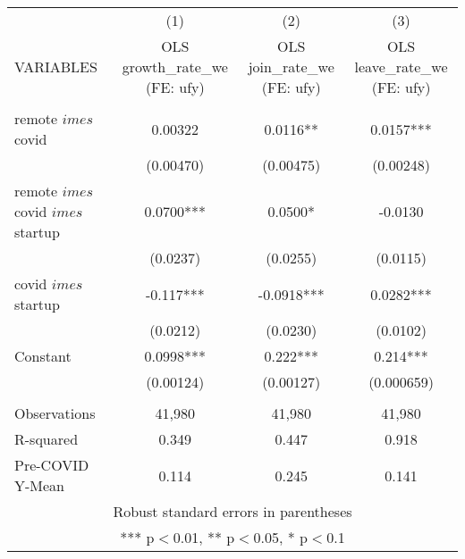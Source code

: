 \documentclass[]{article}
\begin{document}
\begin{tabular}{lccc} \hline
 & (1) & (2) & (3) \\
VARIABLES & OLS growth\_rate\_we (FE: ufy) & OLS join\_rate\_we (FE: ufy) & OLS leave\_rate\_we (FE: ufy) \\ \hline
 &  &  &  \\
remote $	imes$ covid & 0.00322 & 0.0116** & 0.0157*** \\
 & (0.00470) & (0.00475) & (0.00248) \\
remote $	imes$ covid $	imes$ startup & 0.0700*** & 0.0500* & -0.0130 \\
 & (0.0237) & (0.0255) & (0.0115) \\
covid $	imes$ startup & -0.117*** & -0.0918*** & 0.0282*** \\
 & (0.0212) & (0.0230) & (0.0102) \\
Constant & 0.0998*** & 0.222*** & 0.214*** \\
 & (0.00124) & (0.00127) & (0.000659) \\
 &  &  &  \\
Observations & 41,980 & 41,980 & 41,980 \\
R-squared & 0.349 & 0.447 & 0.918 \\
 Pre-COVID Y-Mean & 0.114 & 0.245 & 0.141 \\ \hline
\multicolumn{4}{c}{ Robust standard errors in parentheses} \\
\multicolumn{4}{c}{ *** p$<$0.01, ** p$<$0.05, * p$<$0.1} \\
\end{tabular}
\end{document}
